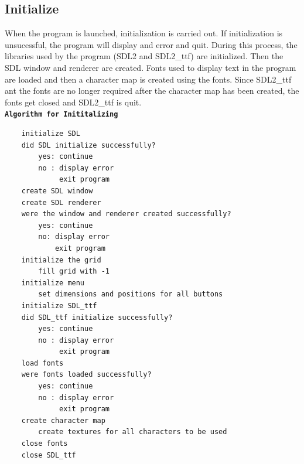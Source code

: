 \documentclass[report.tex]{subfiles}
\begin{document}
    \subsection{Initialize}
    When the program is launched, initialization is carried out. If initialization is unsucessful, the program will display and error and quit. During this process, the libraries used by the program (SDL2 and SDL2\_ttf) are initialized. Then the SDL window and renderer are created. Fonts used to display text in the program are loaded and then a character map is created using the fonts. Since SDL2\_ttf ant the fonts are no longer required after the character map has been created, the fonts get closed and SDL2\_ttf is quit.\\
        \textbf{\texttt{Algorithm for Inititalizing}}
        \begin{verbatim}
    initialize SDL
    did SDL initialize successfully?
        yes: continue
        no : display error
             exit program
    create SDL window
    create SDL renderer
    were the window and renderer created successfully?
        yes: continue
        no: display error
            exit program
    initialize the grid
        fill grid with -1
    initialize menu
        set dimensions and positions for all buttons
    initialize SDL_ttf
    did SDL_ttf initialize successfully?
        yes: continue
        no : display error
             exit program
    load fonts
    were fonts loaded successfully?
        yes: continue
        no : display error
             exit program
    create character map
        create textures for all characters to be used
    close fonts
    close SDL_ttf
        \end{verbatim}
\end{document}
